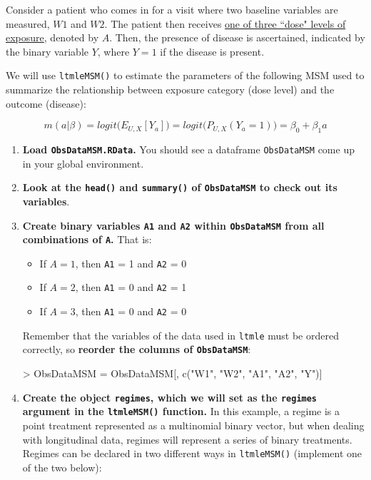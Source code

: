 \documentclass[answers]{exam}
\begin{document}
Consider a patient who comes in for a visit where two baseline variables are measured, $W1$ and $W2$. The patient then receives \underline{one of three ``dose" levels of exposure}, denoted by $A$. Then, the presence of disease is ascertained, indicated by the binary variable $Y$, where $Y = 1$ if the disease is present. 

We will use \texttt{ltmleMSM()} to estimate the parameters of the following MSM used to summarize the relationship between exposure category (dose level) and the outcome (disease):

\[
m(a|\beta) = logit\big(E_{U,X}[Y_a]\big) = logit\big(P_{U,X}(Y_a = 1)\big) =  \beta_0 + \beta_1a
\]



\begin{enumerate}
\item \textbf{Load \texttt{ObsDataMSM.RData}.} You should see a dataframe \texttt{ObsDataMSM} come up in your global environment.
\item \textbf{Look at the \texttt{head()} and \texttt{summary()} of \texttt{ObsDataMSM} to check out its variables}.
\item \textbf{Create binary variables \texttt{A1} and \texttt{A2} within \texttt{ObsDataMSM} from all combinations of \texttt{A}.} That is:
\begin{itemize}
\item If $A = 1$, then \texttt{A1} = 1 and \texttt{A2} = 0
\item If $A = 2$, then \texttt{A1} = 0 and \texttt{A2} = 1
\item If $A = 3$, then \texttt{A1} = 0 and \texttt{A2} = 0
\end{itemize}
Remember that the variables of the data used in \texttt{ltmle} must be ordered correctly, so \textbf{reorder the columns of \texttt{ObsDataMSM}}:
\begin{Schunk}
\begin{Sinput}
> ObsDataMSM = ObsDataMSM[, c("W1", "W2", "A1", "A2", "Y")]
\end{Sinput}
\end{Schunk}
\item \textbf{Create the object \texttt{regimes}, which we will set as the \texttt{regimes} argument in the \texttt{ltmleMSM()} function.} In this example, a regime is a point treatment represented as a multinomial binary vector, but when dealing with longitudinal data, regimes will represent a series of binary treatments. Regimes can be declared in two different ways in \texttt{ltmleMSM()} (implement one of the two below):

\end{enumerate}
\end{document}

